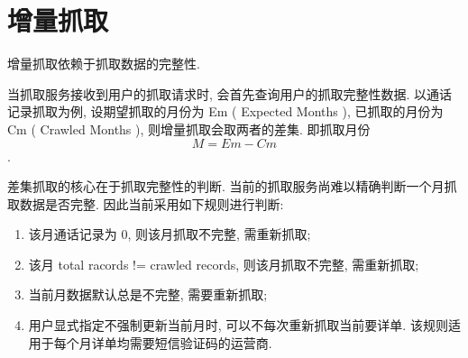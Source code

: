 \documentclass[UTF8]{ctexart}
\begin{document}
\section{增量抓取}
增量抓取依赖于抓取数据的完整性.

当抓取服务接收到用户的抓取请求时, 会首先查询用户的抓取完整性数据. 以通话记录抓取为例, 设期望抓取的月份为 Em ( Expected Months ),
已抓取的月份为 Cm ( Crawled Months ), 则增量抓取会取两者的差集. 即抓取月份 $$ M = Em - Cm $$.

差集抓取的核心在于抓取完整性的判断. 当前的抓取服务尚难以精确判断一个月抓取数据是否完整. 因此当前采用如下规则进行判断:
\begin{enumerate}
	\item 该月通话记录为 0, 则该月抓取不完整, 需重新抓取;
	\item 该月 total racords != crawled records, 则该月抓取不完整, 需重新抓取;
	\item 当前月数据默认总是不完整, 需要重新抓取;
	\item 用户显式指定不强制更新当前月时, 可以不每次重新抓取当前要详单. 该规则适用于每个月详单均需要短信验证码的运营商.
\end{enumerate}
\end{document}
